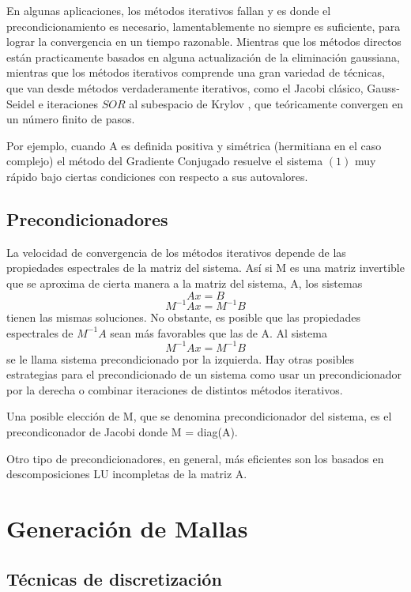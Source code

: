 \documentclass[11pt,letterpaper]{article}
\begin{document}
En algunas aplicaciones, los métodos iterativos fallan y es donde el precondicionamiento es necesario, lamentablemente no siempre es suficiente, para lograr la convergencia en un tiempo razonable.
Mientras que los métodos directos están practicamente basados en alguna actualización de la eliminación gaussiana, mientras que los métodos iterativos comprende una gran variedad de técnicas, que van desde métodos verdaderamente iterativos, como el Jacobi clásico, Gauss-Seidel e iteraciones $SOR$ al subespacio de Krylov , que teóricamente convergen en un número finito de pasos.

Por ejemplo, cuando A es definida positiva y simétrica (hermitiana en el caso complejo) el método del Gradiente Conjugado resuelve el sistema $(1)$ muy rápido bajo ciertas condiciones con respecto a sus autovalores.


\subsection{Precondicionadores}

La velocidad de convergencia de los métodos iterativos depende de las propiedades espectrales de la matriz del sistema. Así si M es una matriz invertible que se aproxima de cierta manera a la matriz del sistema, A, los
sistemas
\[Ax = B\]
\[M^{-1}Ax = M^{-1}B\]
tienen las mismas soluciones. No obstante, es posible que las propiedades espectrales de $M^{-1}A$ sean más favorables que las de A. Al sistema
\[M^{-1}Ax = M^{-1}B\]
se le llama sistema precondicionado por la izquierda. Hay otras posibles estrategias para el precondicionado de un sistema como usar un precondicionador por la derecha o combinar iteraciones de distintos métodos iterativos.

Una posible elección de M, que se denomina precondicionador del sistema, es el precondiconador de Jacobi donde M = diag(A).

Otro tipo de precondicionadores, en general, más eficientes son los basados
en descomposiciones LU incompletas de la matriz A.


\section{Generación de Mallas}

\subsection{Técnicas de discretización}
\end{document}
